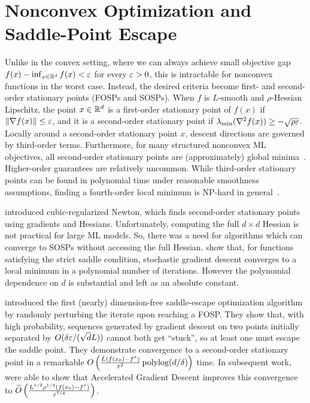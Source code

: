 \section{Nonconvex Optimization and Saddle-Point Escape}
Unlike in the convex setting, where we can always achieve small objective gap $f(x) - \inf_{x \in \mathbb{R}^d} f(x) < \varepsilon$ for every $\varepsilon > 0$, this is intractable for nonconvex functions in the worst case. Instead, the desired criteria become first- and second-order stationary points (FOSPs and SOSPs). When $f$ is $L$-smooth and $\rho$-Hessian Lipschitz, the point $x \in \mathbb{R}^d$ is a first-order stationary point of $f(x)$ if $\left\lVert \nabla f(x) \right\rVert \leq \varepsilon$, and it is a second-order stationary point if $\lambda_{\min}(\nabla^2 f(x)) \geq -\sqrt{\rho\varepsilon}$. Locally around a second-order stationary point $x$, descent directions are governed by third-order terms. Furthermore, for many structured nonconvex ML objectives, all second-order stationary points are (approximately) global minima~\citep{10.1145/3418526}. Higher-order guarantees are relatively uncommon. While third-order stationary points can be found in polynomial time under reasonable smoothness assumptions, finding a fourth-order local minimum is NP-hard in general~\citep{anandkumar2016efficient}.

\citet{nesterov2006cubic} introduced cubic-regularized Newton, which finds second-order stationary points using gradients and Hessians. Unfortunately, computing the full $d \times d$ Hessian is not practical for large ML models. So, there was a need for algorithms which can converge to SOSPs without accessing the full Hessian. \citet{ge2015escaping} show that, for functions satisfying the strict saddle condition, stochastic gradient descent converges to a local minimum in a polynomial number of iterations. However the polynomial dependence on $d$ is substantial and left as an absolute constant.

\citet{jin2017escape} introduced the first (nearly) dimension-free saddle-escape optimization algorithm by randomly perturbing the iterate upon reaching a FOSP. They show that, with high probability, sequences generated by gradient descent on two points initially separated by $O(\delta\varepsilon/(\sqrt{d}L))$ cannot both get ``stuck'', so at least one must escape the saddle point. They demonstrate convergence to a second-order stationary point in a remarkable $O\left(\frac{L(f(x_0) - f^*)}{\varepsilon^2} \operatorname{polylog}(d/\delta) \right)$ time. In subsequent work,~\citet{jin2017accelerated} were able to show that Accelerated Gradient Descent improves this convergence to $\widetilde{O}\left(\frac{L^{1/2} \rho^{1/4}(f(x_0) - f^*)}{\varepsilon^{7/4}}\right)$.

